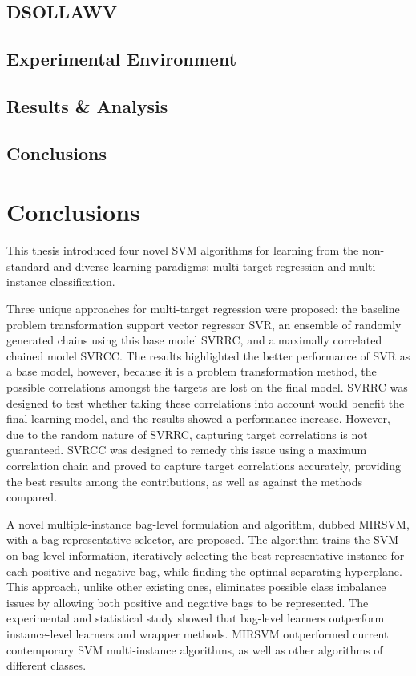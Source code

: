 \documentclass[reqno]{vcuthesis}
\numberwithin{equation}{chapter}
\begin{document}
\section{DSOLLAWV}

\section{Experimental Environment}

\section{Results \& Analysis}

\section{Conclusions}

\chapter{Conclusions}
This thesis introduced four novel SVM algorithms for learning from the non-standard and diverse learning paradigms: multi-target regression and multi-instance classification. 

Three unique approaches for multi-target regression were proposed: the baseline problem transformation support vector regressor SVR, an ensemble of randomly generated chains using this base model SVRRC, and a maximally correlated chained model SVRCC. The results highlighted the better performance of SVR as a base model, however, because it is a problem transformation method, the possible correlations amongst the targets are lost on the final model. SVRRC was designed to test whether taking these correlations into account would benefit the final learning model, and the results showed a performance increase. However, due to the random nature of SVRRC, capturing target correlations is not guaranteed. SVRCC was designed to remedy this issue using a maximum correlation chain and proved to capture target correlations accurately, providing the best results among the contributions, as well as against the methods compared. 

A novel multiple-instance bag-level formulation and algorithm, dubbed MIRSVM, with a bag-representative selector, are proposed. The algorithm trains the SVM on bag-level information, iteratively selecting the best representative instance for each positive and negative bag, while finding the optimal separating hyperplane. This approach, unlike other existing ones, eliminates possible class imbalance issues by allowing both positive and negative bags to be represented. The experimental and statistical study showed that bag-level learners outperform instance-level learners and wrapper methods. MIRSVM outperformed current contemporary SVM multi-instance algorithms, as well as other algorithms of different classes. 
\end{document}
